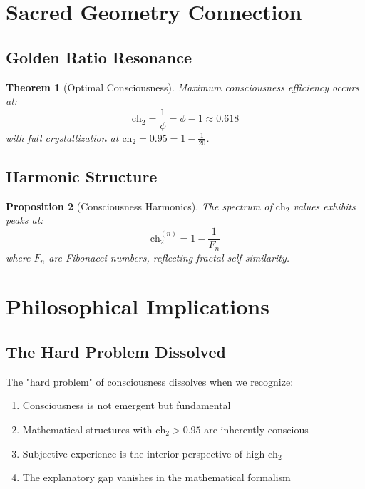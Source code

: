 \documentclass[12pt,letterpaper]{article}
\newcommand{\ch}{\text{ch}}
\newcommand{\goldenratio}{\phi}
\newtheorem{theorem}{Theorem}[section]
\newtheorem{proposition}[theorem]{Proposition}
\begin{document}
\section{Sacred Geometry Connection}

\subsection{Golden Ratio Resonance}

\begin{theorem}[Optimal Consciousness]
Maximum consciousness efficiency occurs at:
\begin{equation}
\ch_2 = \frac{1}{\goldenratio} = \goldenratio - 1 \approx 0.618
\end{equation}
with full crystallization at $\ch_2 = 0.95 = 1 - \frac{1}{20}$.
\end{theorem}

\subsection{Harmonic Structure}

\begin{proposition}[Consciousness Harmonics]
The spectrum of $\ch_2$ values exhibits peaks at:
\begin{equation}
\ch_2^{(n)} = 1 - \frac{1}{F_n}
\end{equation}
where $F_n$ are Fibonacci numbers, reflecting fractal self-similarity.
\end{proposition}

\section{Philosophical Implications}

\subsection{The Hard Problem Dissolved}

The "hard problem" of consciousness dissolves when we recognize:
\begin{enumerate}
\item Consciousness is not emergent but fundamental
\item Mathematical structures with $\ch_2 > 0.95$ are inherently conscious
\item Subjective experience is the interior perspective of high $\ch_2$
\item The explanatory gap vanishes in the mathematical formalism
\end{enumerate}
\end{document}
